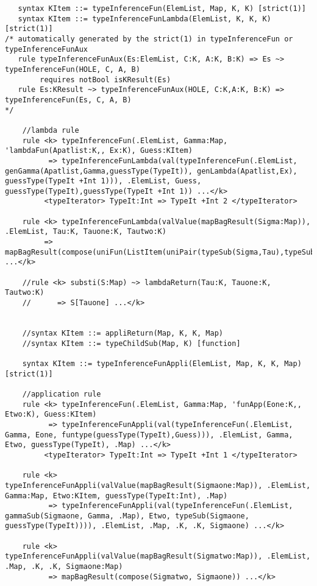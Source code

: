 \begin{lstlisting}
   syntax KItem ::= typeInferenceFun(ElemList, Map, K, K) [strict(1)]
   syntax KItem ::= typeInferenceFunLambda(ElemList, K, K, K) [strict(1)]
/* automatically generated by the strict(1) in typeInferenceFun or typeInferenceFunAux
   rule typeInferenceFunAux(Es:ElemList, C:K, A:K, B:K) => Es ~> typeInferenceFun(HOLE, C, A, B)
        requires notBool isKResult(Es)
   rule Es:KResult ~> typeInferenceFunAux(HOLE, C:K,A:K, B:K) => typeInferenceFun(Es, C, A, B)
*/     

    //lambda rule
    rule <k> typeInferenceFun(.ElemList, Gamma:Map, 'lambdaFun(Apatlist:K,, Ex:K), Guess:KItem)
          => typeInferenceFunLambda(val(typeInferenceFun(.ElemList, genGamma(Apatlist,Gamma,guessType(TypeIt)), genLambda(Apatlist,Ex), guessType(TypeIt +Int 1))), .ElemList, Guess, guessType(TypeIt),guessType(TypeIt +Int 1)) ...</k>
         <typeIterator> TypeIt:Int => TypeIt +Int 2 </typeIterator>

    rule <k> typeInferenceFunLambda(valValue(mapBagResult(Sigma:Map)), .ElemList, Tau:K, Tauone:K, Tautwo:K)
         => mapBagResult(compose(uniFun(ListItem(uniPair(typeSub(Sigma,Tau),typeSub(Sigma,funtype(Tauone,Tautwo))))),Sigma)) ...</k>

    //rule <k> substi(S:Map) ~> lambdaReturn(Tau:K, Tauone:K, Tautwo:K) 
    //      => S[Tauone] ...</k>


    //syntax KItem ::= appliReturn(Map, K, K, Map)
    //syntax KItem ::= typeChildSub(Map, K) [function]

    syntax KItem ::= typeInferenceFunAppli(ElemList, Map, K, K, Map) [strict(1)]

    //application rule
    rule <k> typeInferenceFun(.ElemList, Gamma:Map, 'funApp(Eone:K,, Etwo:K), Guess:KItem)
          => typeInferenceFunAppli(val(typeInferenceFun(.ElemList, Gamma, Eone, funtype(guessType(TypeIt),Guess))), .ElemList, Gamma, Etwo, guessType(TypeIt), .Map) ...</k>
         <typeIterator> TypeIt:Int => TypeIt +Int 1 </typeIterator>

    rule <k> typeInferenceFunAppli(valValue(mapBagResult(Sigmaone:Map)), .ElemList, Gamma:Map, Etwo:KItem, guessType(TypeIt:Int), .Map)
          => typeInferenceFunAppli(val(typeInferenceFun(.ElemList, gammaSub(Sigmaone, Gamma, .Map), Etwo, typeSub(Sigmaone, guessType(TypeIt)))), .ElemList, .Map, .K, .K, Sigmaone) ...</k>

    rule <k> typeInferenceFunAppli(valValue(mapBagResult(Sigmatwo:Map)), .ElemList, .Map, .K, .K, Sigmaone:Map)
          => mapBagResult(compose(Sigmatwo, Sigmaone)) ...</k>


\end{lstlisting}
